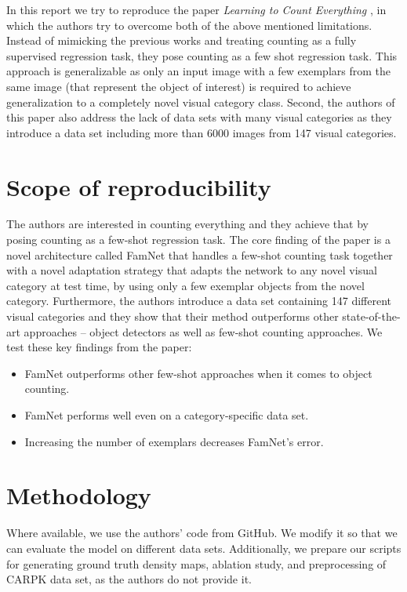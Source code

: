 In this report we try to reproduce the paper \textit{Learning to Count Everything} \cite{ranjan2021learning}, in which the authors try to overcome both of the above mentioned limitations. Instead of mimicking the previous works and treating counting as a fully supervised regression task, they pose counting as a few shot regression task. This approach is generalizable as only an input image with a few exemplars from the same image (that represent the object of interest) is required to achieve generalization to a completely novel visual category class. Second, the authors of this paper also address the lack of data sets with many visual categories as they introduce a data set including more than 6000 images from 147 visual categories.


\section{Scope of reproducibility}
\label{sec:claims}
The authors are interested in counting everything and they achieve that by posing counting as a few-shot regression task. The core finding of the paper is a novel architecture called FamNet that handles a few-shot counting task together with a novel adaptation strategy that adapts the network to any novel visual category at test time, by using only a few exemplar objects from the novel category. Furthermore, the authors introduce a data set containing 147 different visual categories and they show that their method outperforms other state-of-the-art approaches -- object detectors as well as few-shot counting approaches. We test these key findings from the paper:

\begin{itemize}
	\item FamNet outperforms other few-shot approaches when it comes to object counting.
	\item FamNet performs well even on a category-specific data set.
	\item Increasing the number of exemplars decreases FamNet's error.
\end{itemize}

\section{Methodology}
Where available, we use the authors' code from GitHub. We modify it so that we can evaluate the model on different data sets. Additionally, we prepare our scripts for generating ground truth density maps, ablation study, and preprocessing of CARPK data set, as the authors do not provide it.

